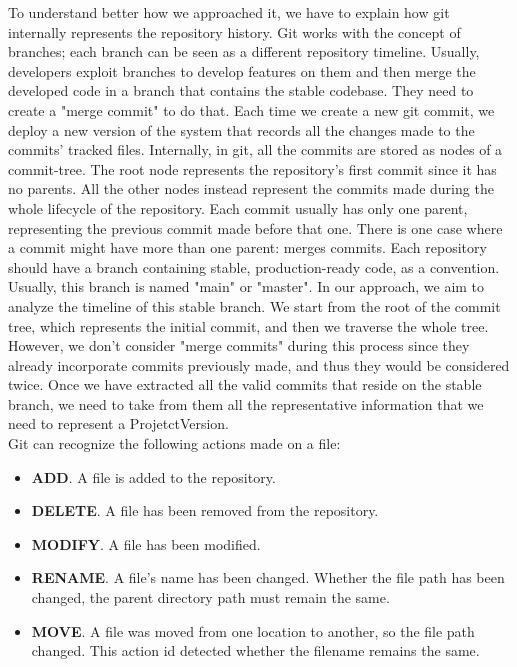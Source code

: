 To understand better how we approached it, we have to explain how git internally represents the repository history. 
Git works with the concept of branches; each branch can be seen as a different repository timeline.
Usually, developers exploit branches to develop features on them and then merge the developed code in a branch that contains the stable codebase.
They need to create a "merge commit" to do that. 
Each time we create a new git commit, we deploy a new version of the system that records all the changes made to the commits' tracked files. 
Internally, in git, all the commits are stored as nodes of a commit-tree. 
The root node represents the repository's first commit since it has no parents. 
All the other nodes instead represent the commits made during the whole lifecycle of the repository. 
Each commit usually has only one parent, representing the previous commit made before that one.
There is one case where a commit might have more than one parent: merges commits.
\bigbreak
Each repository should have a branch containing stable, production-ready code, as a convention. Usually, this branch is named "main" or "master". 
In our approach, we aim to analyze the timeline of this stable branch. We start from the root of the commit tree, which represents the initial commit, and then we traverse the whole tree. 
However, we don't consider "merge commits" during this process since they already incorporate commits previously made, and thus they would be considered twice. 
Once we have extracted all the valid commits that reside on the stable branch, we need to take from them all the representative information that we need to represent a ProjetctVersion. \\
\bigbreak
Git can recognize the following actions made on a file:
\begin{itemize}
    \item \textbf{ADD}. A file is added to the repository.
    \item \textbf{DELETE}. A file has been removed from the repository.
    \item \textbf{MODIFY}. A file has been modified.
    \item \textbf{RENAME}. A file's name has been changed. Whether the file path has been changed, the parent directory path must remain the same. 
    \item \textbf{MOVE}. A file was moved from one location to another, so the file path changed. This action id detected whether the filename remains the same. 
\end{itemize}

